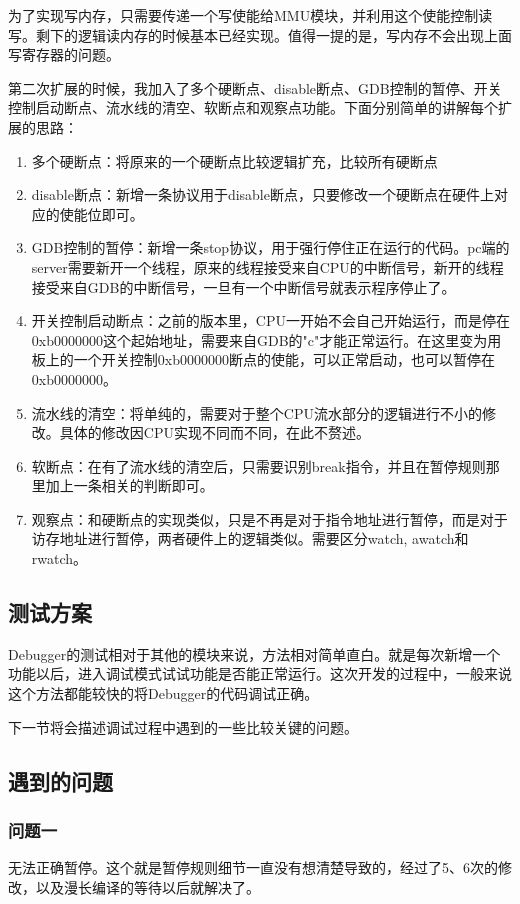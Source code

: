 为了实现写内存，只需要传递一个写使能给MMU模块，并利用这个使能控制读写。剩下的逻辑读内存的时候基本已经实现。值得一提的是，写内存不会出现上面写寄存器的问题。

第二次扩展的时候，我加入了多个硬断点、disable断点、GDB控制的暂停、开关控制启动断点、流水线的清空、软断点和观察点功能。下面分别简单的讲解每个扩展的思路：
\begin{enumerate}
\item 多个硬断点：将原来的一个硬断点比较逻辑扩充，比较所有硬断点
\item disable断点：新增一条协议用于disable断点，只要修改一个硬断点在硬件上对应的使能位即可。
\item GDB控制的暂停：新增一条stop协议，用于强行停住正在运行的代码。pc端的server需要新开一个线程，原来的线程接受来自CPU的中断信号，新开的线程接受来自GDB的中断信号，一旦有一个中断信号就表示程序停止了。
\item 开关控制启动断点：之前的版本里，CPU一开始不会自己开始运行，而是停在0xb0000000这个起始地址，需要来自GDB的"c"才能正常运行。在这里变为用板上的一个开关控制0xb0000000断点的使能，可以正常启动，也可以暂停在0xb0000000。
\item 流水线的清空：将单纯的，需要对于整个CPU流水部分的逻辑进行不小的修改。具体的修改因CPU实现不同而不同，在此不赘述。
\item 软断点：在有了流水线的清空后，只需要识别break指令，并且在暂停规则那里加上一条相关的判断即可。
\item 观察点：和硬断点的实现类似，只是不再是对于指令地址进行暂停，而是对于访存地址进行暂停，两者硬件上的逻辑类似。需要区分watch, awatch和rwatch。
\end{enumerate}


\subsection{测试方案}
Debugger的测试相对于其他的模块来说，方法相对简单直白。就是每次新增一个功能以后，进入调试模式试试功能是否能正常运行。这次开发的过程中，一般来说这个方法都能较快的将Debugger的代码调试正确。

下一节将会描述调试过程中遇到的一些比较关键的问题。

\subsection{遇到的问题}
\subsubsection{问题一}
无法正确暂停。这个就是暂停规则细节一直没有想清楚导致的，经过了5、6次的修改，以及漫长编译的等待以后就解决了。
